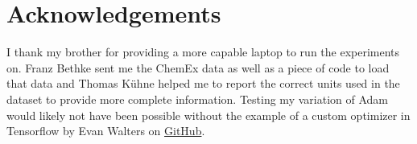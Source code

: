 \section{Acknowledgements}
I thank my brother for providing a more capable laptop to run the experiments on.
Franz Bethke sent me the ChemEx data as well as a piece of code to load that data and Thomas Kühne helped me to report the correct units used in the dataset to provide more complete information.
Testing my variation of Adam would likely not have been possible without the example of a custom optimizer in Tensorflow by Evan Walters on \href{https://github.com/evanatyourservice}{GitHub}.
